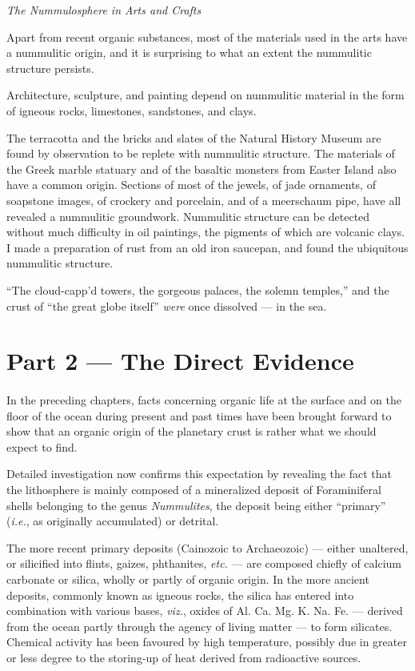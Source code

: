 \documentclass[a4paper, 12pt, oneside]{article}
\begin{document}
\centerline{\emph{The Nummulosphere in Arts and Crafts}}

Apart from recent organic substances, most of the materials used in the arts have a nummulitic origin, and it is surprising to what an extent the nummulitic structure persists.

Architecture, sculpture, and painting depend on nummulitic material in the form of igneous rocks, limestones, sandstones, and clays.

The terracotta and the bricks and slates of the Natural History Museum are found by observation to be replete with nummulitic structure. The materials of the Greek marble statuary and of the basaltic monsters from Easter Island also have a common origin. Sections of most of the jewels, of jade ornaments, of soapstone images, of crockery and porcelain, and of a meerschaum pipe, have all revealed a nummulitic groundwork. Nummulitic structure can be detected without much difficulty in oil paintings, the pigments of which are volcanic clays. I made a preparation of rust from an old iron saucepan, and found the ubiquitous nummulitic structure.

``The cloud-capp'd towers, the gorgeous palaces, the solemn temples,'' and the crust of ``the great globe itself'' \emph{were} once dissolved --- in the sea.
\clearpage
\section{Part 2 --- The Direct Evidence}
\paragraph{}
In the preceding chapters, facts concerning organic life at the surface and on the floor of the ocean during present and past times have been brought forward to show that an organic origin of the planetary crust is rather what we should expect to find.

Detailed investigation now confirms this expectation by revealing the fact that the lithosphere is mainly composed of a mineralized deposit of Foraminiferal shells belonging to the genus \emph{Nummulites}, the deposit being either ``primary'' (\emph{i.e.}, as originally accumulated) or detrital.

The more recent primary deposits (Cainozoic to Archaeozoic) --- either unaltered, or silicified into flints, gaizes, phthanites, \emph{etc.} --- are composed chiefly of calcium carbonate or silica, wholly or partly of organic origin. In the more ancient deposits, commonly known as igneous rocks, the silica has entered into combination with various bases, \emph{viz.}, oxides of Al. Ca. Mg. K. Na. Fe. --- derived from the ocean partly through the agency of living matter --- to form silicates. Chemical activity has been favoured by high temperature, possibly due in greater or less degree to the storing-up of heat derived from radioactive sources.
\end{document}
